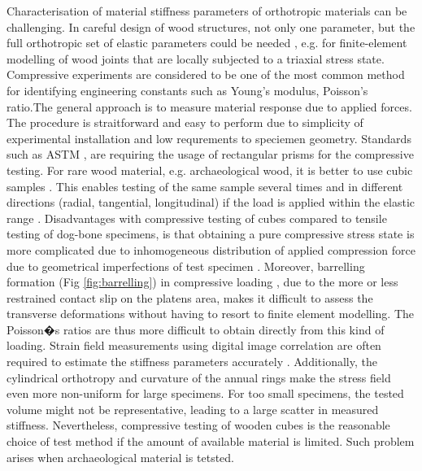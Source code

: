 \documentclass[review]{elsarticle}
\begin{document}
Characterisation of material stiffness parameters of orthotropic materials can
be challenging. In  careful design of wood structures, not only one parameter, but the full
orthotropic set of elastic parameters could be needed \cite{tsoumis1991science},
e.g. for finite-element modelling of wood joints that are locally subjected to a triaxial stress state.
Compressive experiments are considered to be one of the most common method for identifying engineering constants such as Young's
modulus, Poisson's ratio.The general approach is to measure material response
due to applied forces. The procedure is straitforward and easy to perform due to
simplicity of experimental installation and low requrements to speciemen
geometry. Standards such as ASTM \cite{standard1997d143},
\cite{johnson1983compression} are requiring the usage of rectangular prisms for
the compressive testing.
For rare wood material, e.g. archaeological wood, it is better to use cubic
samples \cite{ljungdahl2007transverse}.
This enables testing of the same sample several times and in different directions (radial, tangential, longitudinal) if the load is applied within the elastic range .
Disadvantages with compressive testing of cubes compared to tensile testing of dog-bone specimens, 
is that obtaining a pure compressive stress state is more complicated due to
inhomogeneous distribution of applied compression force due to geometrical
imperfections of test specimen \cite{Toftegaard1999849}.
Moreover, barrelling formation (Fig \ref{fig:barrelling}) in compressive
loading \cite{oldroyd1966stress}, due to the more or less restrained contact slip on the platens area, makes it difficult to assess the 
transverse deformations without having to resort to finite element modelling.
The Poisson�s ratios are thus more difficult to obtain directly from this kind
of loading.
Strain field measurements using digital image correlation are often required to
estimate the stiffness parameters accurately \cite{dahl2009planar,
majano2012test, ozyhar2013moisture}.
Additionally, the cylindrical orthotropy and curvature of the annual rings make the stress field even more non-uniform for large specimens. 
For too small specimens, the tested volume might not be representative, leading to a large scatter in measured stiffness. 
Nevertheless, compressive testing of wooden cubes is the reasonable choice of test method if the amount of available material is limited. 
Such problem arises when archaeological material is tetsted.
\end{document}
